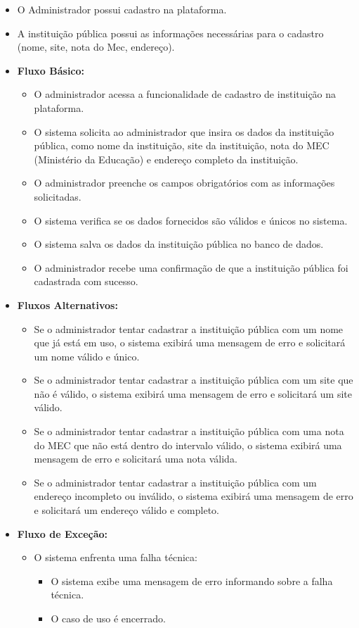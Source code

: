 \begin{itemize}
\begin{itemize}
        \item O Administrador possui cadastro na plataforma.
        \item A instituição pública possui as informações necessárias para o cadastro (nome, site, nota do Mec, endereço).
        \item \textbf{Fluxo Básico:}
        \begin{itemize}
            \item O administrador acessa a funcionalidade de cadastro de instituição na plataforma.
            \item O sistema solicita ao administrador que insira os dados da instituição pública, como nome da instituição, site da instituição, nota do MEC (Ministério da Educação) e endereço completo da instituição.
            \item O administrador preenche os campos obrigatórios com as informações solicitadas.
            \item O sistema verifica se os dados fornecidos são válidos e únicos no sistema.
            \item O sistema salva os dados da instituição pública no banco de dados.
            \item O administrador recebe uma confirmação de que a instituição pública foi cadastrada com sucesso.
        \end{itemize}
        \item \textbf{Fluxos Alternativos:}
        \begin{itemize}
            \item Se o administrador tentar cadastrar a instituição pública com um nome que já está em uso, o sistema exibirá uma mensagem de erro e solicitará um nome válido e único.
            \item Se o administrador tentar cadastrar a instituição pública com um site que não é válido, o sistema exibirá uma mensagem de erro e solicitará um site válido.
            \item Se o administrador tentar cadastrar a instituição pública com uma nota do MEC que não está dentro do intervalo válido, o sistema exibirá uma mensagem de erro e solicitará uma nota válida.
            \item Se o administrador tentar cadastrar a instituição pública com um endereço incompleto ou inválido, o sistema exibirá uma mensagem de erro e solicitará um endereço válido e completo.
        \end{itemize}
        \item \textbf{Fluxo de Exceção:}
        \begin{itemize}
            \item O sistema enfrenta uma falha técnica:
            \begin{itemize}
                \item O sistema exibe uma mensagem de erro informando sobre a falha técnica.
                \item O caso de uso é encerrado.
            \end{itemize}
        \end{itemize}
    \end{itemize}
\end{itemize}
